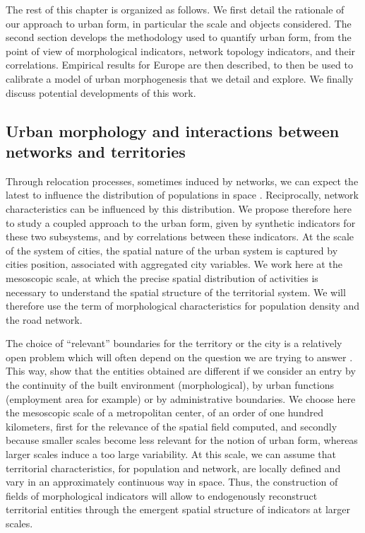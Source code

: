 The rest of this chapter is organized as follows. We first detail the rationale of our approach to urban form, in particular the scale and objects considered. The second section develops the methodology used to quantify urban form, from the point of view of morphological indicators, network topology indicators, and their correlations. Empirical results for Europe are then described, to then be used to calibrate a model of urban morphogenesis that we detail and explore. We finally discuss potential developments of this work.


\subsection{Urban morphology and interactions between networks and territories}

Through relocation processes, sometimes induced by networks, we can expect the latest to influence the distribution of populations in space \citep{wegener2004land}. Reciprocally, network characteristics can be influenced by this distribution. We propose therefore here to study a coupled approach to the urban form, given by synthetic indicators for these two subsystems, and by correlations between these indicators. At the scale of the system of cities, the spatial nature of the urban system is captured by cities position, associated with aggregated city variables. We work here at the mesoscopic scale, at which the precise spatial distribution of activities is necessary to understand the spatial structure of the territorial system. We will therefore use the term of morphological characteristics for population density and the road network.

The choice of ``relevant'' boundaries for the territory or the city is a relatively open problem which will often depend on the question we are trying to answer \citep{paez2005spatial}. This way, \cite{guerois2002commune} show that the entities obtained are different if we consider an entry by the continuity of the built environment (morphological), by urban functions (employment area for example) or by administrative boundaries. We choose here the mesoscopic scale of a metropolitan center, of an order of one hundred kilometers, first for the relevance of the spatial field computed, and secondly because smaller scales become less relevant for the notion of urban form, whereas larger scales induce a too large variability. At this scale, we can assume that territorial characteristics, for population and network, are locally defined and vary in an approximately continuous way in space. Thus, the construction of fields of morphological indicators will allow  to endogenously reconstruct territorial entities through the emergent spatial structure of indicators at larger scales. 



